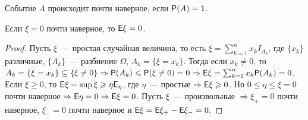 \begin{definition}
	Событие $A$ происходит почти наверное, если $\P(A) = 1$.
\end{definition}
\begin{property}
	Если $\xi = 0$ почти наверное, то $\E\xi = 0$.
	\begin{proof}
		Пусть $\xi$~--- простая случайная величина, то есть $\xi = \sum\limits_{k = 1}^nx_kI_{A_k}$, где $\{x_k\}$ различные, $\{A_k\}$~--- разбиение $\Omega$, $A_k = \{\xi = x_k\}$. Тогда если $x_k \neq 0$, то $A_k = \{\xi = x_k\} \subseteq \{\xi \neq 0\} \Rightarrow \P(A_k) \leqslant \P(\xi \neq 0) = 0 \Rightarrow \E\xi = \sum_{k = 1}^n x_k\P(A_k) = 0$. Если $\xi \geqslant 0$, то $\E\xi = \sup\limits{\xi \geqslant \eta} \E_\eta$, где $\eta$~--- простые $\Rightarrow \E\xi \geqslant 0$. Но $0 \leqslant \eta \leqslant \xi = 0$ почти наверное $\Rightarrow \E\eta = 0 \Rightarrow \E\xi = 0$. Пусть $\xi$~--- произвольные $\Rightarrow \xi_+ = 0$ почти наверное, $\xi_- = 0$ почти наверное и $\E\xi = \E\xi_+ - \E\xi_- = 0.$
	\end{proof} 
\end{property}